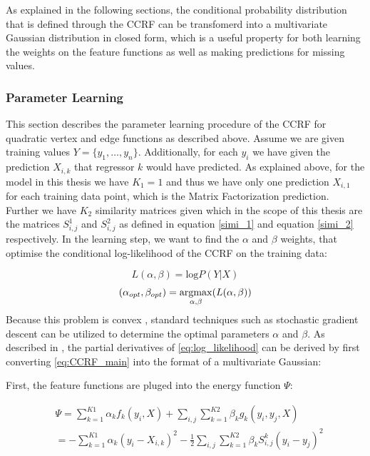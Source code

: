 As explained in the following sections, the conditional probability distribution that is defined through the CCRF can be transfomerd into a multivariate Gaussian distribution in closed form, which is a useful property for both learning the weights on the feature functions as well as making predictions for missing values.
\subsubsection{Parameter Learning}

This section describes the parameter learning procedure of the CCRF for quadratic vertex and edge functions as described above. Assume we are given training values $Y=\{y_1,\dots,y_n\}$. Additionally, for each $y_i$ we have given the prediction $X_{i,k}$ that regressor $k$ would have predicted. As explained above, for the model in this thesis we have $K_1=1$ and thus we have only one prediction $X_{i,1}$ for each training data point, which is the Matrix Factorization prediction. Further we have $K_2$ similarity matrices given which in the scope of this thesis are the matrices $S_{i,j}^1$ and $S_{i,j}^2$ as defined in equation \ref{simi_1} and equation \ref{simi_2} respectively. In the learning step, we want to find the $\alpha$ and $\beta$ weights, that optimise the conditional log-likelihood of the CCRF on the training data:

\begin{equation}  
\label{eq:log_likelihood}
L(\alpha,\beta)=\text{log}P(Y|X)
\end{equation}
\begin{equation}  
(\alpha_{opt}, \beta_{opt}) = \operatorname*{argmax}_{\alpha, \beta}(L(\alpha,\beta))
\end{equation}
Because this problem is convex \cite{qin2009global}, standard techniques such as stochastic gradient descent can be utilized to determine the optimal parameters $\alpha$ and $\beta$. As described in \cite{baltruvsaitis2013dimensional}, the partial derivatives of \ref{eq:log_likelihood} can be derived by first converting \ref{eq:CCRF_main} into the format of a multivariate Gaussian:

First, the feature functions are pluged into the energy function $\Psi$:

\begin{equation}
\label{learning:Psi}
\begin{split}
& \Psi = \sum\limits_{k=1}^{K1} \alpha_k f_k(y_i, X) + \sum_{i,j} \sum \limits_{k=1}^{K2} \beta_k g_k (y_i, y_j,X) \\
& = -\sum\limits_{k=1}^{K1} \alpha_k (y_i - X_{i,k})^2 - \frac{1}{2} \sum_{i,j} \sum \limits_{k=1}^{K2} \beta_k S_{i,j}^k(y_i-y_j)^2
\end{split}
\end{equation}

